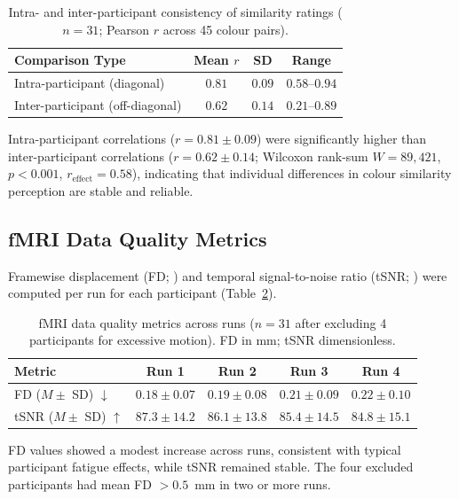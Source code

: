 \documentclass[11pt]{article}
\begin{document}
\begin{table}[H]
\centering
\caption{Intra- and inter-participant consistency of similarity ratings ($n = 31$; Pearson $r$ across 45 colour pairs).}
\label{tab:doublepass}
\begin{tabular}{lccc}
\toprule
Comparison Type & Mean $r$ & SD & Range \\
\midrule
Intra-participant (diagonal) & $0.81$ & $0.09$ & $0.58$--$0.94$ \\
Inter-participant (off-diagonal) & $0.62$ & $0.14$ & $0.21$--$0.89$ \\
\bottomrule
\end{tabular}
\end{table}

Intra-participant correlations ($r = 0.81 \pm 0.09$) were significantly higher than inter-participant correlations ($r = 0.62 \pm 0.14$; Wilcoxon rank-sum $W = 89{,}421$, $p < 0.001$, $r_{\mathrm{effect}} = 0.58$), indicating that individual differences in colour similarity perception are stable and reliable.

\subsection{fMRI Data Quality Metrics}

Framewise displacement (FD; \citealt{power2012spurious}) and temporal signal-to-noise ratio (tSNR; \citealt{esteban2019mriqc}) were computed per run for each participant (Table~\ref{tab:quality}).

\begin{table}[H]
\centering
\caption{fMRI data quality metrics across runs ($n = 31$ after excluding 4 participants for excessive motion). FD in mm; tSNR dimensionless.}
\label{tab:quality}
\begin{tabular}{lcccc}
\toprule
Metric & Run 1 & Run 2 & Run 3 & Run 4 \\
\midrule
FD ($M \pm$ SD) $\downarrow$ & $0.18 \pm 0.07$ & $0.19 \pm 0.08$ & $0.21 \pm 0.09$ & $0.22 \pm 0.10$ \\
tSNR ($M \pm$ SD) $\uparrow$ & $87.3 \pm 14.2$ & $86.1 \pm 13.8$ & $85.4 \pm 14.5$ & $84.8 \pm 15.1$ \\
\bottomrule
\end{tabular}
\end{table}

FD values showed a modest increase across runs, consistent with typical participant fatigue effects, while tSNR remained stable. The four excluded participants had mean FD $> 0.5$~mm in two or more runs.
\end{document}
